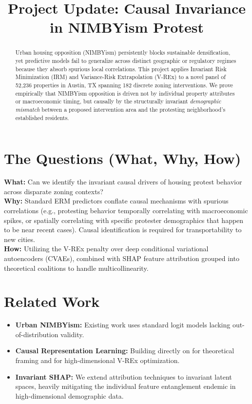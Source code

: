 \documentclass[11pt,twoside]{article}
\begin{document}
\newpage
\title{\textbf{Project Update: Causal Invariance in NIMBYism Protest}}
\maketitle
\thispagestyle{empty}

\begin{abstract}
Urban housing opposition (NIMBYism) persistently blocks sustainable densification, yet predictive models fail to generalize across distinct geographic or regulatory regimes because they absorb spurious local correlations. This project applies Invariant Risk Minimization (IRM) and Variance-Risk Extrapolation (V-REx) to a novel panel of 52,236 properties in Austin, TX spanning 182 discrete zoning interventions. We prove empirically that NIMBYism opposition is driven not by individual property attributes or macroeconomic timing, but causally by the structurally invariant \emph{demographic mismatch} between a proposed intervention area and the protesting neighborhood's established residents.
\end{abstract}

\section*{The Questions (What, Why, How)}
\textbf{What:} Can we identify the invariant causal drivers of housing protest behavior across disparate zoning contexts? \\
\textbf{Why:} Standard ERM predictors conflate causal mechanisms with spurious correlations (e.g., protesting behavior temporally correlating with macroeconomic spikes, or spatially correlating with specific protester demographics that happen to be near recent cases). Causal identification is required for transportability to new cities. \\
\textbf{How:} Utilizing the V-REx penalty over deep conditional variational autoencoders (CVAEs), combined with SHAP feature attribution grouped into theoretical coalitions to handle multicollinearity.

\section*{Related Work}
\begin{itemize}
    \item \textbf{Urban NIMBYism:} Existing work \citep{monkkonen2022nimby} uses standard logit models lacking out-of-distribution validity.
    \item \textbf{Causal Representation Learning:} Building directly on \citet{peters2016icp} for theoretical framing and \citet{krueger2021rex} for high-dimensional V-REx optimization.
    \item \textbf{Invariant SHAP:} We extend attribution techniques to invariant latent spaces, heavily mitigating the individual feature entanglement endemic in high-dimensional demographic data.
\end{itemize}
\end{document}
